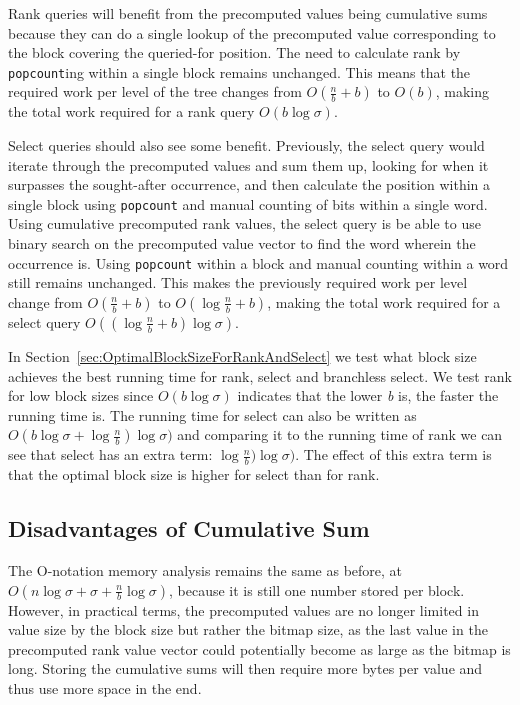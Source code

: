 Rank queries will benefit from the precomputed values being cumulative sums because they can do a single lookup of the precomputed value corresponding to the block covering the queried-for position.
The need to calculate rank by \texttt{popcount}ing within a single block remains unchanged.
This means that the required work per level of the tree changes from $O(\frac{n}{b}+b)$ to $O(b)$, making the total work required for a rank query $O(b \log \sigma)$.

Select queries should also see some benefit.
Previously, the select query would iterate through the precomputed values and sum them up, looking for when it surpasses the sought-after occurrence, and then calculate the position within a single block using \texttt{popcount} and manual counting of bits within a single word.
Using cumulative precomputed rank values, the select query is be able to use binary search on the precomputed value vector to find the word wherein the occurrence is.
Using \texttt{popcount} within a block and manual counting within a word still remains unchanged.
This makes the previously required work per level change from $O(\frac{n}{b} + b)$ to $O(\log \frac{n}{b} + b)$, making the total work required for a select query $O((\log \frac{n}{b} + b) \log \sigma)$.

In Section~\ref{sec:OptimalBlockSizeForRankAndSelect} we test what block size achieves the best running time for rank, select and branchless select.
We test rank for low block sizes since $O(b \log \sigma)$ indicates that the lower \textit{b} is, the faster the running time is.
The running time for select can also be written as $O(b \log \sigma + \log \frac{n}{b}) \log \sigma)$ and comparing it to the running time of rank we can see that select has an extra term: $\log \frac{n}{b}) \log \sigma)$.
The effect of this extra term is that the optimal block size is higher for select than for rank.

\subsection{Disadvantages of Cumulative Sum}
The O-notation memory analysis remains the same as before, at $O(n \log \sigma + \sigma + \frac{n}{b} \log \sigma)$, because it is still one number stored per block.
However, in practical terms, the precomputed values are no longer limited in value size by the block size but rather the bitmap size, as the last value in the precomputed rank value vector could potentially become as large as the bitmap is long.
Storing the cumulative sums will then require more bytes per value and thus use more space in the end.

